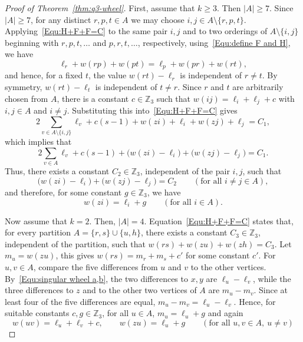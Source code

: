 \documentclass[11pt]{article}
\theoremstyle{remark}
\newcommand{\Z}{\mathbb Z}
\begin{document}
\begin{proof}[Proof of Theorem~\ref{thm:q3-wheel}]
    First, assume that $k\ge3$.
    Then $|A|\ge7$.
    Since $|A|\ge7$, for any distinct $r,p,t\in A$ we may choose $i,j\in A\setminus\{r,p,t\}$.  Applying~\eqref{Equ:H+F+F=C} to the same pair $i,j$ and to two orderings of $A\setminus\{i,j\}$ beginning with $r,p,t,\ldots$ and $p,r,t,\ldots$, respectively, using~\eqref{Equ:define F and H}, we have
    \[
        \ell_r+w(rp)+w(pt)=\ell_p+w(pr)+w(rt),
    \]
    and hence, for a fixed $t$, the value $w(rt)-\ell_r$ is independent of $r\ne t$.
    By symmetry, $w(rt)-\ell_t$ is independent of $t\ne r$.
    Since $r$ and $t$ are arbitrarily chosen from $A$, there is a constant $c\in\Z_3$ such that $w(ij)=\ell_i+\ell_j+c$ with $i,j\in A$ and $i\ne j$.
    Substituting this into~\eqref{Equ:H+F+F=C} gives
    \begin{equation*}
        2\sum_{v\in A\setminus\{i,j\}}\ell_v+c(s-1)+w(zi)+\ell_i+w(zj)+\ell_j=C_1,
    \end{equation*}
    which implies that
    \begin{equation*}
        2\sum_{v\in A}\ell_v+c(s-1)+\bigl(w(zi)-\ell_i\bigr)+
        \bigl(w(zj)-\ell_j\bigr)=C_1.
    \end{equation*}
    Thus, there exists a constant $C_2\in \Z_3$, independent of the pair $i,j$, such that
    \[
        \bigl(w(zi)-\ell_i\bigr)+\bigl(w(zj)-\ell_j\bigr)=C_2
        \qquad(\text{for all }i\ne j\in A),
    \]
    and therefore, for some constant $g\in\Z_3$, we have
    \[
        w(zi)=\ell_i+g \qquad (\text{for all }i\in A).
    \]

    Now assume that $k=2$.
    Then, $|A|=4$.
    Equation~\eqref{Equ:H+F+F=C} states that, for every partition $A=\{r,s\}\cup\{u,h\}$, there exists a constant $C_3\in \Z_3$, independent of the partition, such that $w(rs)+w(zu)+w(zh)=C_3$.
    Let $m_u=w(zu)$, this gives $w(rs)=m_r+m_s+c'$ for some constant $c'$.
    For $u,v\in A$, compare the five differences from $u$ and $v$ to the other vertices.
    By~\eqref{Equ:singular wheel a,b}, the two differences to $x,y$ are $\ell_u-\ell_v$, while the three differences to $z$ and to the other two vertices of $A$ are $m_u-m_v$.
    Since at least four of the five differences are equal, $m_u-m_v=\ell_u-\ell_v$.
    Hence, for suitable constants $c,g\in\Z_3$, for all $u\in A$, $m_u=\ell_u+g$ and again
    \[
        w(uv)=\ell_u+\ell_v+c,
        \qquad
        w(zu)=\ell_u+g
        \qquad(\text{for all } u,v\in A,\ u\ne v)
    \]



\end{proof}
\end{document}
